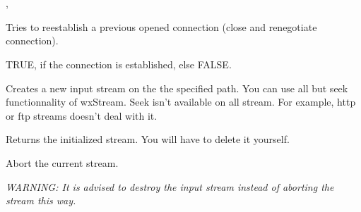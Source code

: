 \section{}\label{wxprotocol}




, 



\label{wxprotoreconnect}


Tries to reestablish a previous opened connection (close and renegotiate connection).


TRUE, if the connection is established, else FALSE.


\label{wxprotogetinput}


Creates a new input stream on the the specified path. You can use all but seek
functionnality of wxStream. Seek isn't available on all stream. For example,
http or ftp streams doesn't deal with it.


Returns the initialized stream. You will have to delete it yourself.


\label{wxprotoabort}


Abort the current stream.

\it{WARNING: It is advised to destroy the input stream instead of aborting the stream this way.}


